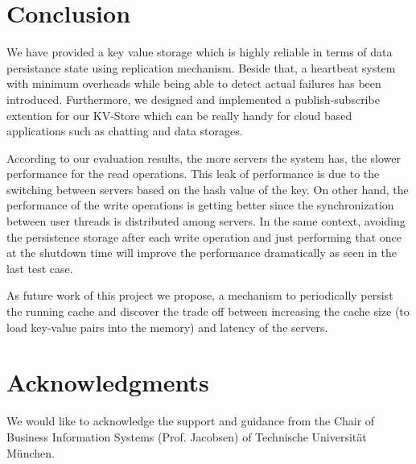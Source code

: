 \documentclass{sig-alternate}
\begin{document}
\section{Conclusion}
We have provided a key value storage which is highly reliable in terms of data persistance state using replication mechanism. Beside that, a heartbeat system with minimum overheads while being able to detect actual failures has been introduced. Furthermore, we designed and implemented a publish-subscribe extention for our KV-Store which can be really handy for cloud based applications such as chatting and data storages.

According to our evaluation results, the more servers the system has, the slower performance for the read operations. This leak of performance is due to the switching between servers based on the hash value of the key. On other hand, the performance of the write operations is getting better since the synchronization between user threads is distributed among servers. In the same context, avoiding the persistence storage after each write operation and just performing that once at the shutdown time will improve the performance dramatically as seen in the last test case.

As future work of this project we propose, a mechanism to periodically persist the running cache and discover the trade off between increasing the cache size (to load key-value pairs into the memory) and latency of the servers. 

\section{Acknowledgments}
We would like to acknowledge the support and guidance from the  Chair of Business Information Systems (Prof. Jacobsen) of Technische Universit{\"a}t M{\"u}nchen.
%

%
%

\end{document}
